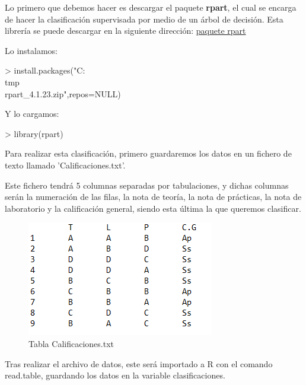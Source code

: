 \documentclass[parskip=full]{scrartcl}
\begin{document}
Lo primero que debemos hacer es descargar el paquete \textbf{rpart}, el cual se encarga de hacer la clasificación supervisada por medio de un árbol de decisión. Esta librería se puede descargar en la siguiente dirección: \href{https://cran.r-project.org/web/packages/rpart/index.html}{paquete rpart}

Lo instalamos:


\begin{Schunk}
\begin{Sinput}
> install.packages("C:\\tmp\\rpart_4.1.23.zip",repos=NULL)
\end{Sinput}
\end{Schunk}


Y lo cargamos:


\begin{Schunk}
\begin{Sinput}
> library(rpart)
\end{Sinput}
\end{Schunk}


Para realizar esta clasificación, primero guardaremos los datos en un fichero de texto llamado 'Calificaciones.txt'. 

Este fichero tendrá 5 columnas separadas por tabulaciones, y dichas columnas serán la numeración de las filas, la nota de teoría, la nota de prácticas, la nota de laboratorio y la calificación general, siendo esta última la que queremos clasificar. 

\begin{figure}[H]
\centering
\includegraphics[width=0.7\linewidth]{images/imagen5.png}
\caption{\label{fig:tabla_calificaciones}Tabla Calificaciones.txt}
\end{figure}

Tras realizar el archivo de datos, este será importado a R con el comando read.table, guardando los datos en la variable clasificaciones.
\end{document}
